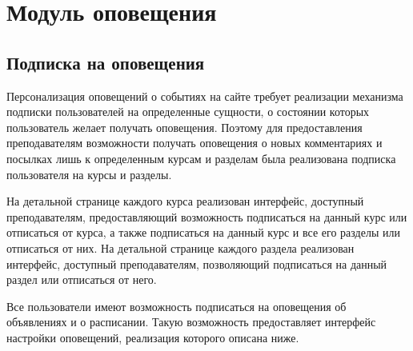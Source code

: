 \documentclass[12pt, a4paper, oneside]{article}
\begin{document}
\section{Модуль оповещения}
\subsection{Подписка на оповещения}
Персонализация оповещений о событиях на сайте требует реализации механизма подписки пользователей на определенные сущности, о состоянии которых пользователь желает получать оповещения. Поэтому для предоставления преподавателям возможности получать оповещения о новых комментариях и посылках лишь к определенным курсам и разделам была реализована подписка пользователя на курсы и разделы.

На детальной странице каждого курса реализован интерфейс, доступный преподавателям, предоставляющий возможность подписаться на данный курс или отписаться от курса, а также подписаться на данный курс и все его разделы или отписаться от них. На детальной странице каждого раздела реализован интерфейс, доступный преподавателям, позволяющий подписаться на данный раздел или отписаться от него.

Все пользователи имеют возможность подписаться на оповещения об объявлениях и о расписании. Такую возможность предоставляет интерфейс настройки оповещений, реализация которого описана ниже.
\end{document}
